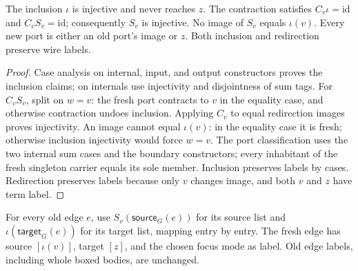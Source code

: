 \begin{lemma}
The inclusion $\iota$ is injective and never reaches $z$. The contraction
satisfies $C_v\iota=\mathrm{id}$ and $C_vS_v=\mathrm{id}$; consequently $S_v$
is injective. No image of $S_v$ equals $\iota(v)$. Every new port is either an
old port's image or $z$. Both inclusion and redirection preserve wire labels.
\end{lemma}
\begin{proof}
Case analysis on internal, input, and output constructors proves the inclusion
claims; on internals use injectivity and disjointness of sum tags. For
$C_vS_v$, split on $w=v$: the fresh port contracts to $v$ in the equality case,
and otherwise contraction undoes inclusion. Applying $C_v$ to equal redirection
images proves injectivity. An image cannot equal $\iota(v)$: in the equality
case it is fresh; otherwise inclusion injectivity would force $w=v$.
The port classification uses the two internal sum cases and the boundary
constructors; every inhabitant of the fresh singleton carrier equals its sole
member. Inclusion preserves labels by cases. Redirection preserves labels
because only $v$ changes image, and both $v$ and $z$ have term label.
\end{proof}

\begin{definition}
For every old edge $e$, use $S_v(\mathsf{source}_G(e))$ for its source list and
$\iota(\mathsf{target}_G(e))$ for its target list, mapping entry by entry.
The fresh edge has source $[\iota(v)]$, target $[z]$, and the chosen focus mode
as label. Old edge labels, including whole boxed bodies, are unchanged.
\end{definition}

